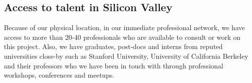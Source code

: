 \subsection*{Access to talent in Silicon Valley}
Because of our physical location, in our immediate professional network, we have access to more than 20-40 professionals who are available to consult or work on
this project. Also, we have graduates, post-docs and  interns from reputed universities close-by such as Stanford
University, University of California Berkeley and their professors who we have been in touch with through professional
workshops, conferences and meetups.
